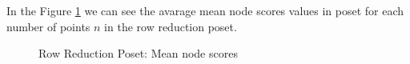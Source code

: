 \documentclass{article}
\begin{document}
\par In the Figure \ref{fig:scores_node_mean_rrp} we can see the avarage mean node scores values in poset for each number of points $n$ in the row reduction poset.
\begin{figure}[ht]
  \vspace{-96pt}
  \centering
  \hspace*{-0.18999999999999995\textwidth}
  \caption{Row Reduction Poset: Mean node scores}
  \label{fig:scores_node_mean_rrp}
\end{figure}
\end{document}
